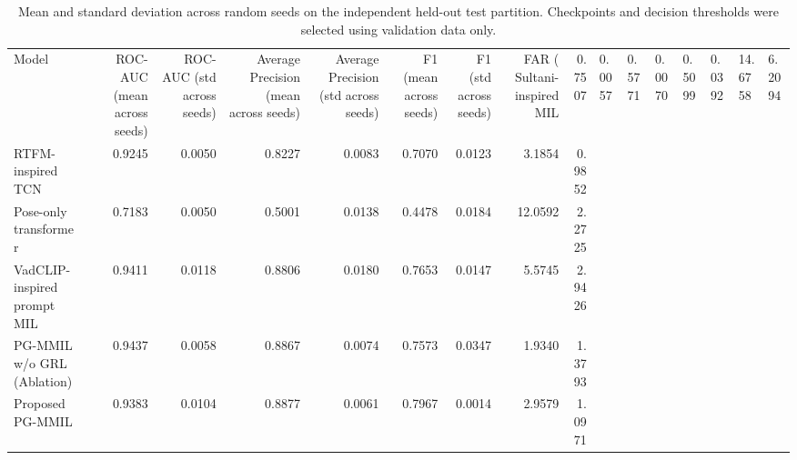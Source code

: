 \begin{table}
\caption{Mean and standard deviation across random seeds on the independent held-out test partition. Checkpoints and decision thresholds were selected using validation data only.}
\label{tab:independent_test_performance}
\begin{tabular}{lrrrrrrrr}
\toprule
Model & ROC-AUC (mean across seeds) & ROC-AUC (std across seeds) & Average Precision (mean across seeds) & Average Precision (std across seeds) & F1 (mean across seeds) & F1 (std across seeds) & FAR (%
\midrule
Sultani-inspired MIL & 0.7507 & 0.0057 & 0.5771 & 0.0070 & 0.5099 & 0.0392 & 14.6758 & 6.2094 \\
RTFM-inspired TCN & 0.9245 & 0.0050 & 0.8227 & 0.0083 & 0.7070 & 0.0123 & 3.1854 & 0.9852 \\
Pose-only transformer & 0.7183 & 0.0050 & 0.5001 & 0.0138 & 0.4478 & 0.0184 & 12.0592 & 2.2725 \\
VadCLIP-inspired prompt MIL & 0.9411 & 0.0118 & 0.8806 & 0.0180 & 0.7653 & 0.0147 & 5.5745 & 2.9426 \\
PG-MMIL w/o GRL (Ablation) & 0.9437 & 0.0058 & 0.8867 & 0.0074 & 0.7573 & 0.0347 & 1.9340 & 1.3793 \\
Proposed PG-MMIL & 0.9383 & 0.0104 & 0.8877 & 0.0061 & 0.7967 & 0.0014 & 2.9579 & 1.0971 \\
\bottomrule
\end{tabular}
\end{table}
